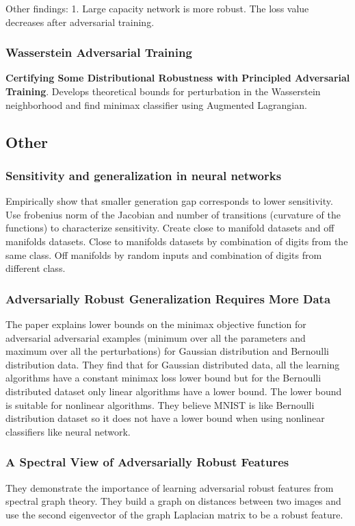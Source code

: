 \documentclass[10pt,a4paper]{article}
\begin{document}
Other findings: 1. Large capacity network is more robust. The loss value decreases after adversarial training.
\subsubsection{Wasserstein Adversarial Training}
\textbf{Certifying Some Distributional Robustness with Principled Adversarial Training\cite{sinha2018certifying}}. Develops theoretical bounds for perturbation in the Wasserstein neighborhood and find minimax classifier using Augmented Lagrangian.
\subsection{Other}
\subsubsection{Sensitivity and generalization in neural networks\cite{novak2018sensitivity}}
Empirically show that smaller generation gap corresponds to lower sensitivity. Use frobenius norm of the Jacobian and number of transitions (curvature of the functions) to characterize sensitivity. Create close to manifold datasets and off manifolds datasets. Close to manifolds datasets by combination of digits from the same class. Off manifolds by random inputs and combination of digits from different class.
\subsubsection{Adversarially Robust Generalization Requires More Data \cite{schmidt2018adversarially}}
The paper explains lower bounds on the minimax objective function for adversarial adversarial examples (minimum over all the parameters and maximum  over all the perturbations) for Gaussian distribution and Bernoulli distribution data. They find that for Gaussian distributed data, all the learning algorithms have a constant minimax loss lower bound but for the Bernoulli distributed dataset only linear algorithms have a lower bound. The lower bound is suitable for nonlinear algorithms. They believe MNIST is like Bernoulli distribution dataset so it does not have a lower bound when using nonlinear classifiers like neural network.
\subsubsection{A Spectral View of Adversarially Robust Features \cite{garg2018spectral}}
They demonstrate the importance of learning adversarial robust features from spectral graph theory. They build a graph on distances between two images and use the second eigenvector of the graph Laplacian matrix to be a robust feature.
\end{document}
